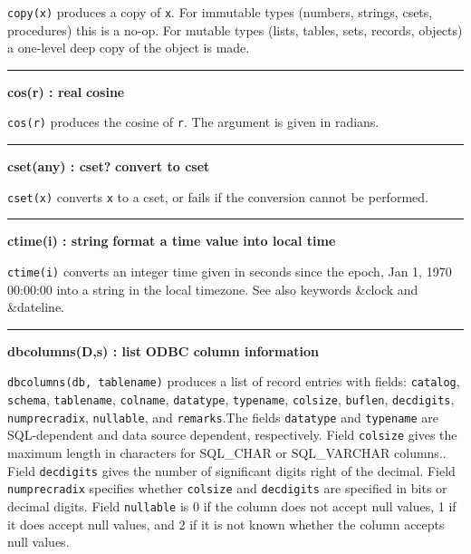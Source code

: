 \noindent
{}\texttt{copy(x)} produces a copy of \texttt{x}. For immutable
types (numbers, strings, csets, procedures) this is a no-op. For mutable
types (lists, tables, sets, records, objects) a one-level deep copy of
the object is made.

\bigskip\hrule\vspace{0.1cm}
\noindent
{\bf cos(r) : real } \hfill {\bf cosine}

\noindent
{}\texttt{cos(r)} produces the cosine of \texttt{r}. The argument
is given in radians.

\bigskip\hrule\vspace{0.1cm}
\noindent
{\bf cset(any) : cset? } \hfill {\bf convert to cset}

\noindent
{}\texttt{cset(x)} converts \texttt{x} to a cset,
or fails if the conversion cannot be performed.

\bigskip\hrule\vspace{0.1cm}
\noindent
{\bf ctime(i) : string } \hfill {\bf format a time value into local time }

\noindent
{}\texttt{ctime(i)} converts an integer time
given in seconds since the epoch, Jan 1, 1970 00:00:00 into a string in
the local timezone. See also keywords \&clock and \&dateline.

\bigskip\hrule\vspace{0.1cm}
\noindent
{\bf dbcolumns(D,s) : list } \hfill {\bf ODBC column information}

\noindent
{}\texttt{dbcolumns(db, tablename)} produces a list
of record entries with fields:
\texttt{catalog}, \texttt{schema}, \texttt{tablename},
\texttt{colname}, \texttt{datatype}, \texttt{typename}, \texttt{colsize},
\texttt{buflen}, \texttt{decdigits}, \texttt{numprecradix},
\texttt{nullable}, and \texttt{remarks}.The fields
\texttt{datatype} and \texttt{typename} are SQL-dependent and data
source dependent, respectively. Field \texttt{colsize} gives the
maximum length in characters for SQL\_CHAR or SQL\_VARCHAR columns..
Field \texttt{decdigits} gives the number of significant digits right
of the decimal. Field \texttt{numprecradix} specifies whether
\texttt{colsize} and \texttt{decdigits} are specified in bits or
decimal digits. Field \texttt{nullable} is 0 if the column does not
accept null values, 1 if it does accept null values, and 2 if it is not
known whether the column accepts null values.

